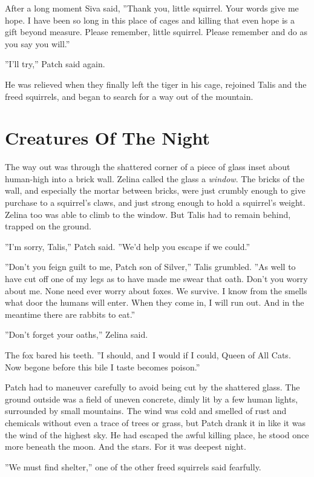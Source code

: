 \documentclass[12pt]{book}
\begin{document}
After a long moment Siva said, ''Thank you, little squirrel. Your words give me hope. I have been so long in this place of cages and killing that even hope is a gift beyond measure. Please remember, little squirrel. Please remember and do as you say you will.''

''I'll try,'' Patch said again.

He was relieved when they finally left the tiger in his cage, rejoined Talis and the freed squirrels, and began to search for a way out of the mountain.


\section{Creatures Of The Night}

The way out was through the shattered corner of a piece of glass inset about human-high into a brick wall. Zelina called the glass a {\it window}. The bricks of the wall, and especially the mortar between bricks, were just crumbly enough to give purchase to a squirrel's claws, and just strong enough to hold a squirrel's weight. Zelina too was able to climb to the window. But Talis had to remain behind, trapped on the ground.

''I'm sorry, Talis,'' Patch said. ''We'd help you escape if we could.''

''Don't you feign guilt to me, Patch son of Silver,'' Talis grumbled. ''As well to have cut off one of my legs as to have made me swear that oath. Don't you worry about me. None need ever worry about foxes. We survive. I know from the smells what door the humans will enter. When they come in, I will run out. And in the meantime there are rabbits to eat.''

''Don't forget your oaths,'' Zelina said.

The fox bared his teeth. ''I should, and I would if I could, Queen of All Cats. Now begone before this bile I taste becomes poison.''

Patch had to maneuver carefully to avoid being cut by the shattered glass. The ground outside was a field of uneven concrete, dimly lit by a few human lights, surrounded by small mountains. The wind was cold and smelled of rust and chemicals without even a trace of trees or grass, but Patch drank it in like it was the wind of the highest sky. He had escaped the awful killing place, he stood once more beneath the moon. And the stars. For it was deepest night.

''We must find shelter,'' one of the other freed squirrels said fearfully.
\end{document}

